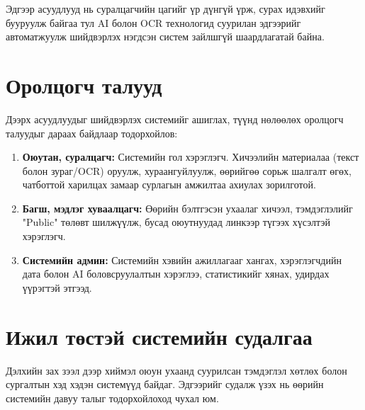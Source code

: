 Эдгээр асуудлууд нь суралцагчийн цагийг үр дүнгүй үрж, сурах идэвхийг бууруулж байгаа тул AI болон OCR технологид суурилан эдгээрийг автоматжуулж шийдвэрлэх нэгдсэн систем зайлшгүй шаардлагатай байна.

\section{Оролцогч талууд}
Дээрх асуудлуудыг шийдвэрлэх системийг ашиглах, түүнд нөлөөлөх оролцогч талуудыг дараах байдлаар тодорхойлов:
\begin{enumerate}
    \item \textbf{Оюутан, суралцагч:} Системийн гол хэрэглэгч. Хичээлийн материалаа (текст болон зураг/OCR) оруулж, хураангуйлуулж, өөрийгөө сорьж шалгалт өгөх, чатботтой харилцах замаар сурлагын амжилтаа ахиулах зорилготой.
    \item \textbf{Багш, мэдлэг хуваалцагч:} Өөрийн бэлтгэсэн ухаалаг хичээл, тэмдэглэлийг "Public" төлөвт шилжүүлж, бусад оюутнуудад линкээр түгээх хүсэлтэй хэрэглэгч.
    \item \textbf{Системийн админ:} Системийн хэвийн ажиллагааг хангах, хэрэглэгчдийн дата болон AI боловсруулалтын хэрэглээ, статистикийг хянах, удирдах үүрэгтэй этгээд.
\end{enumerate}

\section{Ижил төстэй системийн судалгаа}
Дэлхийн зах зээл дээр хиймэл оюун ухаанд суурилсан тэмдэглэл хөтлөх болон сургалтын хэд хэдэн системүүд байдаг. Эдгээрийг судалж үзэх нь өөрийн системийн давуу талыг тодорхойлоход чухал юм.

